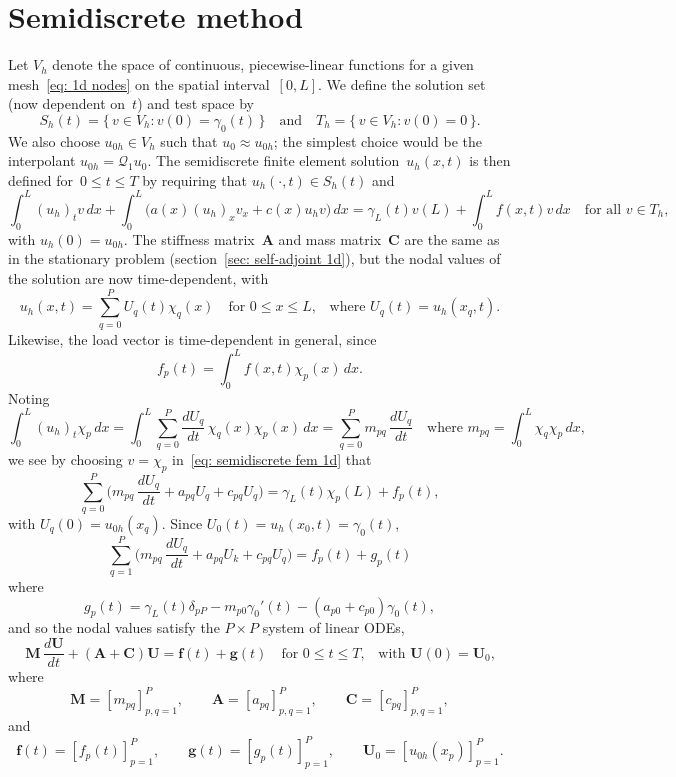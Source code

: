 \section{Semidiscrete method}\label{sec: semidiscrete parabolic FEM}
Let $V_h$ denote the space of continuous, piecewise-linear functions for a 
given mesh~\eqref{eq: 1d nodes} on the spatial interval~$[0,L]$.  We define the 
solution set (now dependent on~$t$) and test space by
\[
S_h(t)=\{\,v\in V_h:v(0)=\gamma_0(t)\,\}
\quad\text{and}\quad
T_h=\{\,v\in V_h:v(0)=0\,\}.
\]
We also choose $u_{0h}\in V_h$ such that $u_0\approx u_{0h}$; the simplest 
choice would be the interpolant $u_{0h}=\mathcal{Q}_1u_0$. The semidiscrete
finite element solution~$u_h(x,t)$ is then defined for~$0\le t\le T$ by 
requiring that $u_h(\cdot,t)\in S_h(t)$ and
\begin{equation}\label{eq: semidiscrete fem 1d}
\int_0^L(u_h)_tv\,dx+\int_0^L\bigl(a(x)(u_h)_xv_x+c(x)u_hv\bigr)\,dx
    =\gamma_L(t)v(L)+\int_0^Lf(x,t)v\,dx
\quad\text{for all $v\in T_h$,}
\end{equation}
with $u_h(0)=u_{0h}$. The stiffness matrix~$\boldsymbol{A}$ and mass 
matrix~$\boldsymbol{C}$ are the same as in the stationary problem 
(section~\ref{sec: self-adjoint 1d}), but the nodal 
values of the solution are now time-dependent, with
\[
u_h(x,t)=\sum_{q=0}^P U_q(t)\chi_q(x)\quad\text{for $0\le x\le L$,}\quad
\text{where $U_q(t)=u_h(x_q,t)$.}
\]
Likewise, the load vector is time-dependent in general, since 
\[
f_p(t)=\int_0^Lf(x,t)\chi_p(x)\,dx.
\]
Noting 
\[
\int_0^L(u_h)_t\chi_p\,dx=\int_0^L\sum_{q=0}^P
    \frac{dU_q}{dt}\,\chi_q(x)\chi_p(x)\,dx=\sum_{q=0}^P m_{pq}\,\frac{dU_q}{dt}
    \quad\text{where $m_{pq}=\int_0^L\chi_q\chi_p\,dx$,}
\]
we see by choosing $v=\chi_p$ in~\eqref{eq: semidiscrete fem 1d} that
\[
\sum_{q=0}^P\biggl(m_{pq}\,\frac{dU_q}{dt}+a_{pq}U_q+c_{pq}U_q\biggr)
    =\gamma_L(t)\chi_p(L)+f_p(t),
\]
with $U_q(0)=u_{0h}(x_q)$.  Since $U_0(t)=u_h(x_0,t)=\gamma_0(t)$,
\[
\sum_{q=1}^P\biggl(m_{pq}\,\frac{dU_q}{dt}+a_{pq}U_k+c_{pq}U_q\biggr)
    =f_p(t)+g_p(t)
\]
where
\[
g_p(t)=\gamma_L(t)\delta_{pP}-m_{p0}\gamma_0'(t)-(a_{p0}+c_{p0})\gamma_0(t),
\]
and so the nodal values satisfy the $P\times P$ system of linear ODEs,
\begin{equation}\label{eq: semidiscrete fem 1d ODE}
\boldsymbol{M}\,\frac{d\boldsymbol{U}}{dt}
+(\boldsymbol{A}+\boldsymbol{C})\boldsymbol{U}=\boldsymbol{f}(t)
    +\boldsymbol{g}(t)\quad\text{for $0\le t\le T$,}
    \quad\text{with $\boldsymbol{U}(0)=\boldsymbol{U}_0$,}
\end{equation}
where 
\[
\boldsymbol{M}=[m_{pq}]_{p,q=1}^P,\qquad 
\boldsymbol{A}=[a_{pq}]_{p,q=1}^P,\qquad
\boldsymbol{C}=[c_{pq}]_{p,q=1}^P,
\]
and
\[
\boldsymbol{f}(t)=[f_p(t)]_{p=1}^P,\qquad
\boldsymbol{g}(t)=[g_p(t)]_{p=1}^P,\qquad
\boldsymbol{U}_0=[u_{0h}(x_p)]_{p=1}^P.
\]

